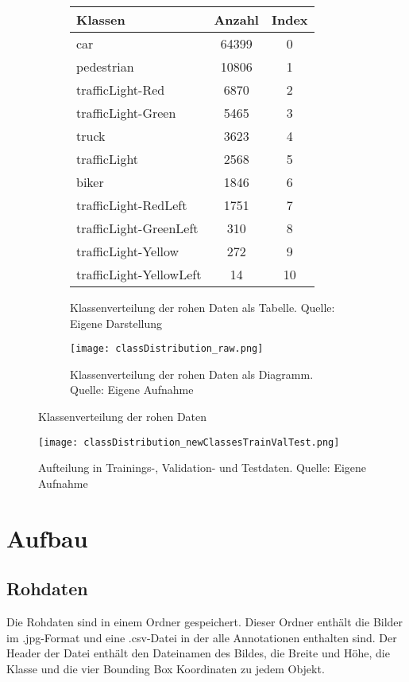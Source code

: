 \begin{figure}
	\begin{subfigure}{0.5\textwidth}
		\centering
		\begin{tabular}{l|c|c}
			\hline
			Klassen & Anzahl & Index \\
			\hline
			\hline
			car & 64399 & 0 \\
			pedestrian & 10806 & 1 \\
			trafficLight-Red & 6870 & 2 \\
			trafficLight-Green & 5465 & 3 \\
			truck & 3623 & 4 \\
			trafficLight & 2568 & 5 \\
			biker & 1846 & 6 \\
			trafficLight-RedLeft & 1751 & 7 \\
			trafficLight-GreenLeft & 310 & 8 \\
			trafficLight-Yellow & 272 & 9 \\
			trafficLight-YellowLeft & 14 & 10 \\
			\hline
		\end{tabular}
		\caption{Klassenverteilung der rohen Daten als Tabelle. Quelle: Eigene Darstellung}
		\label{tab:classDistributionRaw_graph}
	\end{subfigure}%
	\begin{subfigure}{0.5\textwidth}
	\centering
	\texttt{[image: classDistribution\_raw.png]}
	\caption[Klassenverteilung der rohen Daten als Diagramm]{Klassenverteilung der rohen Daten als Diagramm. Quelle: Eigene Aufnahme}
	\label{fig:classDistributionRaw_graph}
	\end{subfigure}%
	\caption{Klassenverteilung der rohen Daten}
	\label{fig:classDistributionRaw}
\end{figure}


\begin{figure}
	\centering
		\texttt{[image: classDistribution\_newClassesTrainValTest.png]}
		\caption[Aufteilung in Trainings-, Validation- und Testdaten]{Aufteilung in Trainings-, Validation- und Testdaten. Quelle: Eigene Aufnahme}
		\label{fig:datasetTrainValTestSplit}
\end{figure}


\section{Aufbau}
\subsection{Rohdaten}
Die Rohdaten sind in einem Ordner gespeichert. Dieser Ordner enthält die Bilder im .jpg-Format und eine .csv-Datei in der alle Annotationen enthalten sind. Der Header der Datei enthält den Dateinamen des Bildes, die Breite und Höhe, die Klasse und die vier Bounding Box Koordinaten zu jedem Objekt.

